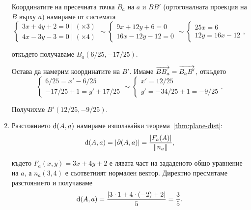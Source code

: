 \documentclass[numbers=endperiod, DIV=15, bibliography=totocnumbered]{scrartcl}
\begin{document}
\begin{solution}
\begin{enumerate}[label=\alph*)]
    Координатите на пресечната точка $B_a$ на $a$ и $BB'$ (ортогоналната проекция на $B$ върху $a$) намираме от системата
    \begin{displaymath}
      \begin{cases}
        3x + 4y + 2 = 0 \mid (\times 3) \\
        4x - 3y - 3 = 0 \mid (\times 4)
      \end{cases}
      \sim
      \begin{cases}
        9x + 12y + 6 = 0 \\
        16x - 12y - 12 = 0
      \end{cases}
      \sim
      \begin{cases}
        25x = 6 \\
        12y = 16x - 12
      \end{cases},
    \end{displaymath}

    откъдето получаваме $B_a(6/25, -17/25)$.

    Остава да намерим координатите на $B'$. Имаме $\overrightarrow{BB_a} = \overrightarrow{B_a B'}$, откъдето
    \begin{displaymath}
      \begin{cases}
        6/25 = x' - 6/25 \\
        -17/25 + 1 = y' + 17/25
      \end{cases}
      \sim
      \begin{cases}
        x' = 12/25 \\
        y' = -34/25 + 1 = -9/25
      \end{cases}.
    \end{displaymath}

    Получихме $B'(12/25, -9/25)$.

    \item Разстоянието $\operatorname{d}(A, a)$ намираме използвайки теорема~\ref{thm:plane-dist}:
    \begin{displaymath}
      \operatorname{d}(A, a) = \left\vert \partial(A, a) \right\vert = \frac {\left\vert F_a(A) \right\vert} {\left\Vert n_a \right\Vert},
    \end{displaymath}

    където $F_a(x, y) = 3x + 4y + 2$ е лявата част на зададеното общо уравнение на $a$, а $n_a(3, 4)$ е съответният нормален вектор. Директно пресмятаме разстоянието и получаваме
    \begin{displaymath}
      \operatorname{d}(A, a) = \frac {\left\vert 3 \cdot 1 + 4 \cdot (-2) + 2 \right\vert} 5 = \frac 3 5.
    \end{displaymath}


\end{enumerate}
\end{solution}
\end{document}
